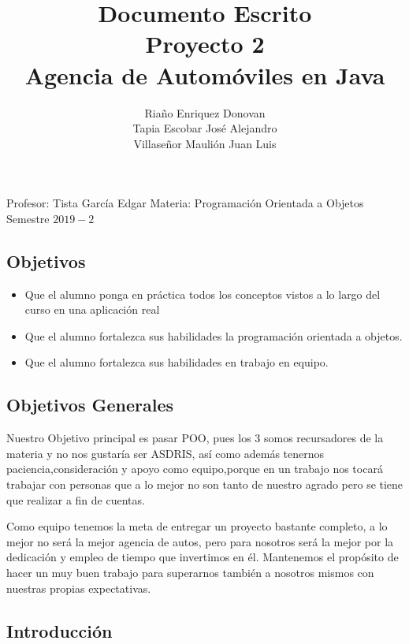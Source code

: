 \documentclass{article}
\title{Documento Escrito \\Proyecto 2\\ Agencia de Automóviles en Java}
\author{Riaño Enriquez Donovan \\ Tapia Escobar José Alejandro\\Villaseñor Maulión Juan Luis}
\begin{document}
\maketitle 
\begin{flushleft}
Profesor: Tista García Edgar \newline \newline
Materia: Programación Orientada a Objetos \newline \newline
Semestre $2019-2$
\end{flushleft}
\clearpage

\begin{center}
\section{Objetivos}
\end{center}
\begin{itemize}
\item Que el alumno ponga en práctica todos los conceptos vistos a lo largo del curso en una aplicación real
\item Que el alumno fortalezca sus habilidades la programación orientada a objetos.
\item  Que el alumno fortalezca sus habilidades en trabajo en equipo.
\end{itemize}

\subsection{Objetivos Generales}
Nuestro Objetivo principal es pasar POO, pues los 3 somos recursadores de la materia y no nos gustaría ser ASDRIS, así como además tenernos paciencia,consideración y apoyo como equipo,porque  en un trabajo nos tocará trabajar con personas que a lo mejor no son tanto de nuestro agrado pero se tiene que realizar a fin de cuentas.

Como equipo tenemos la meta de entregar un proyecto bastante completo, a lo mejor no será la mejor agencia de autos, pero para nosotros será la mejor por la dedicación y empleo de tiempo que invertimos en él. Mantenemos el propósito de hacer un muy buen trabajo para superarnos también a nosotros mismos con nuestras propias expectativas.

\begin{center}
\section{Introducción}
\end{center}
\end{document}
